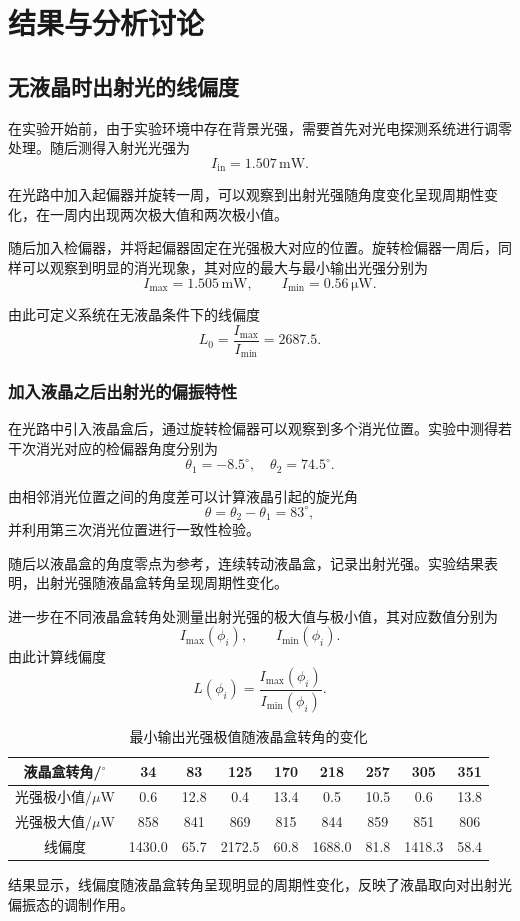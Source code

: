 \documentclass[a4paper, 1.5lines]{ctexart}
\begin{document}
\section{结果与分析讨论}

\subsection{无液晶时出射光的线偏度}

在实验开始前，由于实验环境中存在背景光强，需要首先对光电探测系统进行调零处理。随后测得入射光光强为
\[
I_{\text{in}} = 1.507\,\mathrm{mW}.
\]

在光路中加入起偏器并旋转一周，可以观察到出射光强随角度变化呈现周期性变化，在一周内出现两次极大值和两次极小值。

随后加入检偏器，并将起偏器固定在光强极大对应的位置。旋转检偏器一周后，同样可以观察到明显的消光现象，其对应的最大与最小输出光强分别为
\[
I_{\max} = 1.505\,\mathrm{mW}, \qquad
I_{\min} = 0.56\,\mathrm{\mu W}.
\]

由此可定义系统在无液晶条件下的线偏度
\begin{equation*}
L_0 = \frac{I_{\max}}{I_{\min}} = 2687.5.
\end{equation*}

\subsubsection{加入液晶之后出射光的偏振特性}

在光路中引入液晶盒后，通过旋转检偏器可以观察到多个消光位置。实验中测得若干次消光对应的检偏器角度分别为
\[
\theta_1 = -8.5^{\circ}, \quad
\theta_2 = 74.5^{\circ}.
\]

由相邻消光位置之间的角度差可以计算液晶引起的旋光角
\[
\theta = \theta_2 - \theta_1 = 83^{\circ},
\]
并利用第三次消光位置进行一致性检验。

随后以液晶盒的角度零点为参考，连续转动液晶盒，记录出射光强。实验结果表明，出射光强随液晶盒转角呈现周期性变化。

进一步在不同液晶盒转角处测量出射光强的极大值与极小值，其对应数值分别为
\[
I_{\max}(\phi_i) , \qquad
I_{\min}(\phi_i) .
\]
由此计算线偏度
\[
L(\phi_i) = \frac{I_{\max}(\phi_i)}{I_{\min}(\phi_i)} .
\]

\begin{table}[h!]
    \centering
    \caption{最小输出光强极值随液晶盒转角的变化}
    \label{key}
    \begin{tabular}{ccccccccc}
        \toprule
        液晶盒转角/$^\circ$ 
        & 34 & 83 & 125 & 170 & 218 & 257 & 305 & 351 \\
        \midrule
        光强极小值/$\mu$W 
        & 0.6 & 12.8 & 0.4 & 13.4 & 0.5 & 10.5 & 0.6 & 13.8 \\
        光强极大值/$\mu$W 
        & 858 & 841 & 869 & 815 & 844 & 859 & 851 & 806 \\
        线偏度 
        & 1430.0 & 65.7 & 2172.5 & 60.8 
        & 1688.0 & 81.8 & 1418.3 & 58.4 \\
        \bottomrule
    \end{tabular}
\end{table}
结果显示，线偏度随液晶盒转角呈现明显的周期性变化，反映了液晶取向对出射光偏振态的调制作用。
\end{document}
